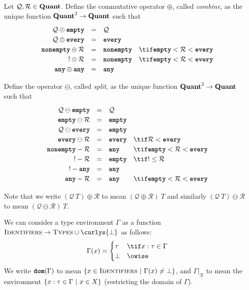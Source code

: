 \documentclass[dvipsnames, usenames, sigconf]{acmart}
\begin{document}
\begin{definition}
    Let $\mathcal{Q}, \mathcal{R} \in \textbf{Quant}$.
    Define the commutative operator $\oplus$, called \emph{combine}, as the unique function $\textbf{Quant}^2 \to \textbf{Quant}$ such that
    \[
        \renewcommand\arraystretch{1.2}
        \begin{array}{r c l l l}
            \mathcal{Q} \oplus \emptyq & = & \mathcal{Q} & \\
            \mathcal{Q} \oplus \every & = & \every & \\
            \nonempty \oplus \mathcal{R} & = & \nonempty & \tif \emptyq < \mathcal{R} < \every \\
            \exactlyone \oplus \mathcal{R} & = & \nonempty & \tif \emptyq < \mathcal{R} < \every \\
            \any \oplus \any & = & \any &
        \end{array}
    \]

    Define the operator $\ominus$, called \emph{split}, as the unique function $\textbf{Quant}^2 \to \textbf{Quant}$ such that
    \[
        \renewcommand\arraystretch{1.2}
        \begin{array}{r c l l l}
            \mathcal{Q} \ominus \emptyq & = & \mathcal{Q} & \\
            \emptyq \ominus \mathcal{R} & = & \emptyq & \\
            \mathcal{Q} \ominus \every &= & \emptyq & \\
            \every \ominus \mathcal{R} &= & \every & \tif \mathcal{R} < \every \\
            \nonempty - \mathcal{R} &= & \any & \tif \emptyq < \mathcal{R} < \every \\
            \exactlyone - \mathcal{R} &= & \emptyq & \tif \exactlyone \leq \mathcal{R} \\
            \exactlyone - \any &= & \any & \\
            \any - \mathcal{R} &= & \any & \tif \emptyq < \mathcal{R} < \every \\
        \end{array}
    \]
\end{definition}

Note that we write $(\mathcal{Q}~T) \oplus \mathcal{R}$ to mean $(\mathcal{Q} \oplus \mathcal{R})~T$ and similarly $(\mathcal{Q}~T) \ominus \mathcal{R}$ to mean $(\mathcal{Q} \ominus \mathcal{R})~T$.

\begin{definition}
    We can consider a type environment $\Gamma$ as a function $\textsc{Identifiers}\xspace \to \textsc{Types}\xspace \cup \curlys{\bot}$ as follows:
    \[
        \Gamma(x) =
        \begin{cases}
            \tau & \tif x : \tau \in \Gamma \\
            \bot & \owise
        \end{cases}
    \]
    We write $\textbf{\texttt{dom}}(\Gamma)$ to mean $\left\{ {x \in \textsc{Identifiers}} ~|~ {\Gamma(x) \neq \bot} \right\}$, and $\Gamma|_X$ to mean the environment $\left\{ {x : \tau \in \Gamma} ~|~ {x \in X} \right\}$ (restricting the domain of $\Gamma$).
\end{definition}
\end{document}
